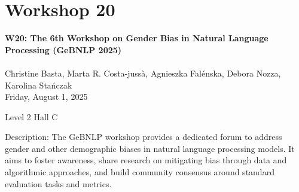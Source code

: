 \clearpage


\section[W20: The 6th Workshop on Gender Bias in Natural Language Processing (GeBNLP 2025)]{Workshop 20}
\label{workshop_20}

\begin{center}
    {\Large \textbf{W20: The 6th Workshop on Gender Bias in Natural Language Processing (GeBNLP 2025)}}\\
    
\\

Christine Basta, Marta R. Costa-jussà, Agnieszka Falénska, Debora Nozza, Karolina Stańczak\\

    Friday, August 1, 2025
    
 Level 2 Hall C
\end{center}

Description: The GeBNLP workshop provides a dedicated forum to address gender and other demographic biases in natural language processing models. It aims to foster awareness, share research on mitigating bias through data and algorithmic approaches, and build community consensus around standard evaluation tasks and metrics.

